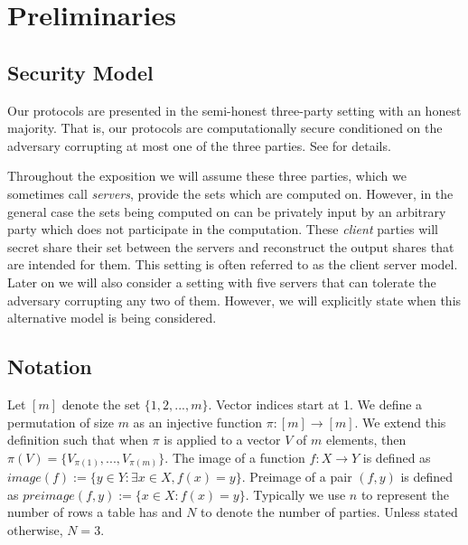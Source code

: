 \section{Preliminaries} \label{sec:prelim}


\subsection{Security Model}

Our protocols are presented in the semi-honest three-party setting with an honest majority. That is, our protocols are computationally secure conditioned on the adversary corrupting at most one of the three parties. See \cite{highthroughput,aby3} for details.


\iffullversion
Throughout the exposition we will assume these three parties, which we sometimes call \emph{servers}, provide the sets which are computed on. However, in the general case the sets being computed on can be privately input by an arbitrary party which does not participate in the computation. These \emph{client} parties will secret share their set between the servers and reconstruct the output shares that are intended for them. This setting is often referred to as the client server model\cite{aby3, secureML}. Later on we will also consider a setting with five servers that can tolerate the adversary corrupting any two of them. However, we will explicitly state when this alternative model is being considered.
\fi


\subsection{Notation}




Let $[m]$ denote the set $\{1,2,...,m\}$. Vector indices start at 1.
We define a permutation of size $m$ as an injective function $\pi : [m] \rightarrow [m]$. We extend this definition such that when $\pi$ is applied to a vector $V$ of $m$ elements, then  $\pi(V)=\{V_{\pi(1)}, ..., V_{\pi(m)}\}$. The image of a function $f : X \rightarrow Y$ is defined as $image(f) := \{y\in Y : \exists x\in X, f(x)=y\}$. Preimage of a pair $(f,y)$ is defined as $preimage(f,y):=\{x\in X : f(x) = y\}$. Typically we use $n$ to represent the number of rows a table has and $N$ to denote the number of parties. Unless stated otherwise, $N=3$.


